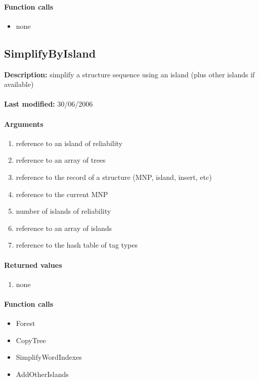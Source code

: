 \paragraph{Function calls}
\begin{itemize}
\item none
\end{itemize}

\subsection{SimplifyByIsland}
\textbf{Description:} simplify a structure sequence using an island (plus other islands if available)\\
\\\textbf{Last modified:} 30/06/2006

\paragraph{Arguments}
\begin{enumerate}
\item reference to an island of reliability
\item reference to an array of trees
\item reference to the record of a structure (MNP, island, insert, etc)
\item reference to the current MNP
\item number of islands of reliability
\item reference to an array of islands
\item reference to the hash table of tag types
\end{enumerate}

\paragraph{Returned values}
\begin{enumerate}
\item none
\end{enumerate}

\paragraph{Function calls}
\begin{itemize}
\item Forest
\item CopyTree
\item SimplifyWordIndexes
\item AddOtherIslands
\end{itemize}

